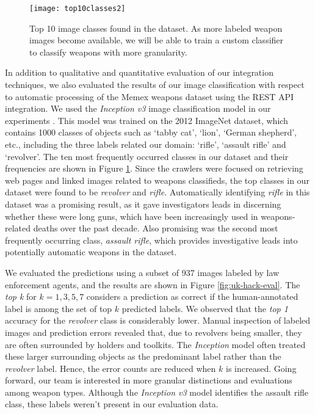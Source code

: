 \begin{figure}
	\texttt{[image: top10classes2]}
	\caption{Top 10 image classes found in the dataset. As more labeled weapon images become available, we will be able to train a custom classifier to classify weapons with more granularity.}
	\label{fig:top10ImgClass}
\end{figure}


In addition to qualitative and quantitative evaluation of our integration techniques, we also evaluated the results of our image classification with respect to automatic processing of the Memex weapons dataset using the REST API integration.  We used the \textit{Inception v3} image classification model in our experiments \cite{SzegedyVISW15}. This model was trained on the 2012 ImageNet dataset, which contains 1000 classes of objects such as `tabby cat', `lion', `German shepherd', etc.,\cite{LSVRC12Synsets, ILSVRC15} including the three labels related our domain: `rifle', `assault rifle' and `revolver'. The ten most frequently occurred classes in our dataset and their frequencies are shown in Figure \ref{fig:top10ImgClass}. Since the crawlers were focused on retrieving web pages and linked images related to weapons classifieds, the top classes in our dataset were found to be \textit{revolver} and \textit{rifle}. Automatically identifying \textit{rifle} in this dataset was a promising result, as it gave investigators leads in discerning whether these were long guns, which have been increasingly used in weapons-related deaths over the past decade. Also promising was the second most frequently occurring class, \textit{assault rifle}, which provides investigative leads into potentially automatic weapons in the dataset.

We evaluated the predictions using a subset of 937 images labeled by law enforcement agents, and the results are shown in Figure \ref{fig:uk-hack-eval}. The \textit{top k} for $k=1,3,5,7$ considers a prediction as correct if the human-annotated label is among the set of top $k$  predicted labels. We observed that the \textit{top 1} accuracy for the \textit{revolver} class is considerably lower. Manual inspection of labeled images and prediction errors revealed that, due to revolvers being smaller, they are often surrounded by holders and toolkits. The \textit{Inception} model often treated these larger surrounding objects as the predominant label rather than the \textit{revolver} label. Hence, the error counts are reduced when $k$ is increased. Going forward, our team is interested in more granular distinctions and evaluations among weapon types. Although the \textit{Inception v3} model identifies the assault rifle class, these labels weren't present in our evaluation data. 

